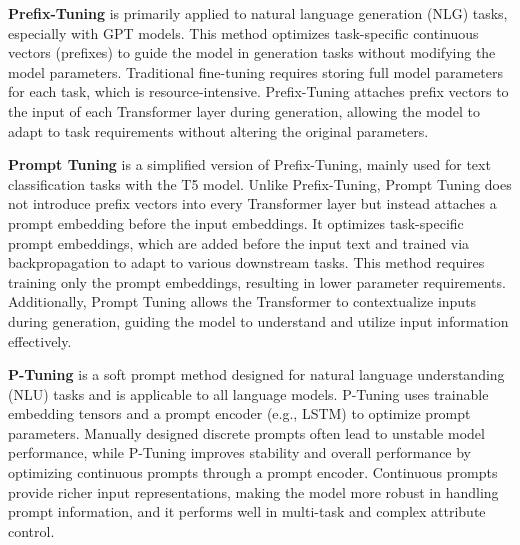 \documentclass[acmsmall, screen]{acmart}
\begin{document}


\textbf{Prefix-Tuning} \cite{li_acl21_PrefixTuning} is primarily applied to natural language generation (NLG) tasks, especially with GPT models. This method optimizes task-specific continuous vectors (prefixes) to guide the model in generation tasks without modifying the model parameters. Traditional fine-tuning requires storing full model parameters for each task, which is resource-intensive. Prefix-Tuning attaches prefix vectors to the input of each Transformer layer during generation, allowing the model to adapt to task requirements without altering the original parameters.

\textbf{Prompt Tuning} \cite{lester_emnlp21_PromptTuning} is a simplified version of Prefix-Tuning, mainly used for text classification tasks with the T5 model. Unlike Prefix-Tuning, Prompt Tuning does not introduce prefix vectors into every Transformer layer but instead attaches a prompt embedding before the input embeddings. It optimizes task-specific prompt embeddings, which are added before the input text and trained via backpropagation to adapt to various downstream tasks. This method requires training only the prompt embeddings, resulting in lower parameter requirements. Additionally, Prompt Tuning allows the Transformer to contextualize inputs during generation, guiding the model to understand and utilize input information effectively.

\textbf{P-Tuning} \cite{liu_arxiv21_PTuning} is a soft prompt method designed for natural language understanding (NLU) tasks and is applicable to all language models. P-Tuning uses trainable embedding tensors and a prompt encoder (e.g., LSTM) to optimize prompt parameters. Manually designed discrete prompts often lead to unstable model performance, while P-Tuning improves stability and overall performance by optimizing continuous prompts through a prompt encoder. Continuous prompts provide richer input representations, making the model more robust in handling prompt information, and it performs well in multi-task and complex attribute control.
\end{document}
